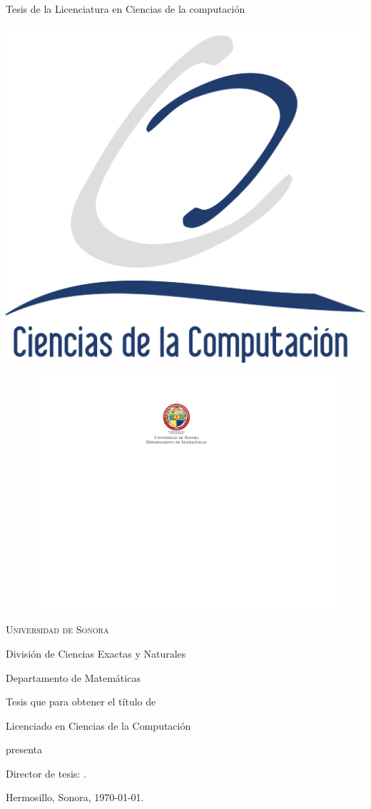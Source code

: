 \thispagestyle{empty}

\begin{center}
  {\Large {\sf Tesis de la Licenciatura en Ciencias de la computación}}

  \vspace{5 cm}

  {\Huge \Titulo}

  \vspace{1 cm}
  {\large \Fecha}
  \vfill
  \includegraphics[width = .2\textwidth]{tesislcc/logoLCC.png}
\end{center}

\cleardoublepage
\thispagestyle{empty}

\begin{center}
	\begin{figure}[H]
		\centering
        \includegraphics[width = .2\textwidth]{tesislcc/escudoUNISON.pdf}
	\end{figure}
    
    {\Large \textsc{Universidad de Sonora}}
    
    \vspace{-.1 cm}
    
    División de Ciencias Exactas y Naturales
    
    \vspace{-.1 cm}
    
    Departamento de Matemáticas
    
    \vspace{2 cm}
    
    {\bf\Huge \Titulo}
    
    \vspace{2 cm}
    
    {\large Tesis que para obtener el título de}
    
    \vspace{.3 cm}
    
    {\LARGE Licenciado en Ciencias de la Computación}
    
    \vspace{.8 cm}
    
    {\large presenta}
    
    \vspace{.3 cm}
    
    {\Huge \textbf{\Autor}}
    
    \vspace{2 cm}
\end{center}

\begin{flushright}
	Director de tesis: \Director.
    
    Hermosillo, Sonora, \today.
\end{flushright}

\newpage
\thispagestyle{empty}

\newpage

